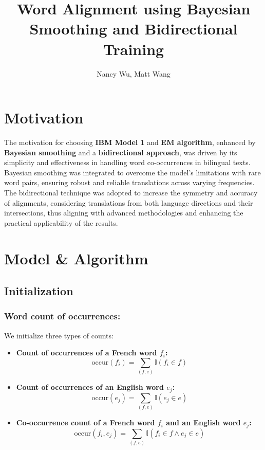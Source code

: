 \documentclass{article}
\title{Word Alignment using Bayesian Smoothing and Bidirectional Training}
\author{Nancy Wu, Matt Wang}
\date{}
\begin{document}
\maketitle

\section{Motivation}
The motivation for choosing \textbf{IBM Model 1} and \textbf{EM algorithm}, enhanced by \textbf{Bayesian smoothing} and a \textbf{bidirectional approach}, was driven by its simplicity and effectiveness in handling word co-occurrences in bilingual texts. Bayesian smoothing was integrated to overcome the model's limitations with rare word pairs, ensuring robust and reliable translations across varying frequencies. The bidirectional technique was adopted to increase the symmetry and accuracy of alignments, considering translations from both language directions and their intersections, thus aligning with advanced methodologies and enhancing the practical applicability of the results. 

\section{Model \& Algorithm}

\subsection{Initialization}

\subsubsection{Word count of occurrences:}
We initialize three types of counts:

\begin{itemize}
    \item \textbf{Count of occurrences of a French word \( f_i \):}
    \[
    \text{occur}(f_i) = \sum_{(f, e)} \mathbb{I}(f_i \in f)
    \]

    \item \textbf{Count of occurrences of an English word \( e_j \):}
    \[
    \text{occur}(e_j) = \sum_{(f, e)} \mathbb{I}(e_j \in e)
    \]
    
    \item \textbf{Co-occurrence count of a French word \( f_i \) and an English word \( e_j \):}
    \[
    \text{occur}(f_i, e_j) = \sum_{(f, e)} \mathbb{I}(f_i \in f \wedge e_j \in e)
    \]
\end{itemize}
\end{document}
